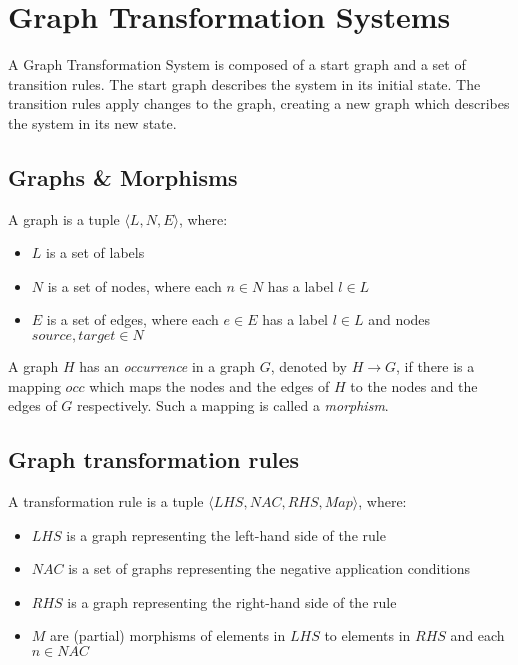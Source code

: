 \section{Graph Transformation Systems}\label{sec:graph}
A Graph Transformation System is composed of a start graph and a set of transition rules. The start graph describes the system in its initial state. The transition rules apply changes to the graph, creating a new graph which describes the system in its new state. 

\subsection{Graphs \& Morphisms}
\begin{definition}
A graph is a tuple $\langle L, N, E\rangle$, where:
\begin{itemize}
  \item $L$ is a set of labels
  \item $N$ is a set of nodes, where each $n \in N$ has a label $l \in L$
  \item $E$ is a set of edges, where each $e \in E$ has a label $l \in L$ and nodes $source,target \in N$
\end{itemize}
\end{definition}


A graph $H$ has an \textit{occurrence} in a graph $G$, denoted by $H \rightarrow G$, if there is a mapping $occ$ which maps the nodes and the edges of $H$ to the nodes and the edges of $G$ respectively. Such a mapping is called a \textit{morphism}.

\subsection{Graph transformation rules}
\begin{definition}
A transformation rule is a tuple $\langle \mathit{LHS}, \mathit{NAC}, \mathit{RHS}, \mathit{Map}\rangle$, where:
\begin{itemize}
  \item $\mathit{LHS}$ is a graph representing the left-hand side of the rule
  \item $\mathit{NAC}$ is a set of graphs representing the negative application conditions
  \item $\mathit{RHS}$ is a graph representing the right-hand side of the rule
  \item $\mathit{M}$ are (partial) morphisms of elements in $\mathit{LHS}$ to elements in $\mathit{RHS}$ and each $n \in \mathit{NAC}$
\end{itemize}
\end{definition}

